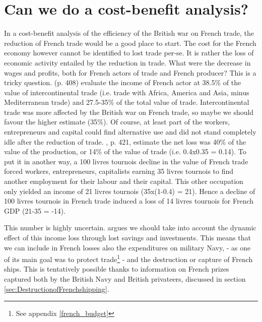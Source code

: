 \documentclass[12pt,a4paper,notitlepage,english]{article}
\begin{document}
\section{Can we do a cost-benefit analysis?}
\label{sec:cost_benefit}
In a cost-benefit analysis of the efficiency of the British war on French trade, the reduction of French trade would be a good place to start. 
The cost for the French economy however cannot be identified to lost trade per-se.
It is rather the loss of economic activity entailed by the reduction in trade.
What were the decrease in wages and profits, both for French actors of trade and French producer?
This is a tricky question.
\cite{Daudin2005} (p. 408) evaluate the income of French actor at 38.5\% of the value of intercontinental trade (i.e. trade with Africa, America and Asia, minus Mediterranean trade) and 27.5-35\% of the total value of trade.
Intercontinental trade was more affected by the British war on French trade, so maybe we should favour the higher estimate (35\%).
Of course, at least part of the workers, entrepreneurs and capital could find alternative use and did not stand completely idle after the reduction of trade. 
\cite{Daudin2005}, p. 421, estimate the net loss was 40\% of the value of the production, or 14\% of the value of trade (i.e. 0.4x0.35 = 0.14). 
To put it in another way, a 100 livres tournois decline in the value of French trade forced workers, entrepreneurs, capitalists earning 35 livres tournois to find another employment for their labour and their capital. This other occupation only yielded an income of 21 livres tournois (35x(1-0.4) = 21).
Hence a decline of 100 livres tournois in French trade induced a loss of 14 livres tournois for French GDP (21-35 = -14). 

This number is highly uncertain. \cite{Daudin2005} argues we should take into account the dynamic effect of this income loss through lost savings and investments. 
This means that we can include in French losses also the expenditures on military Navy, - as one of its main goal was to protect trade\footnote{See appendix \ref{french_budget}} - and the destruction or capture of French ships. This is tentatively possible thanks to information on French prizes captured both by the British Navy and British privateers, discussed in section \ref{sec:DestructionofFrenchshipping}.
\end{document}
